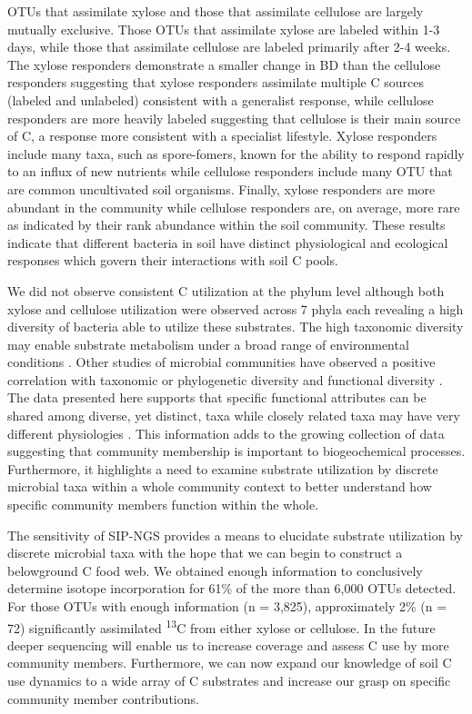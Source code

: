 OTUs that assimilate xylose and those that assimilate cellulose are largely mutually exclusive. Those OTUs that assimilate xylose are labeled within 1-3 days, while those that assimilate cellulose are labeled primarily after 2-4 weeks. The xylose responders demonstrate a smaller change in BD than the cellulose responders suggesting that xylose responders assimilate multiple C sources (labeled and unlabeled) consistent with a generalist response, while cellulose responders are more heavily labeled suggesting that cellulose is their main source of C, a response more consistent with a specialist lifestyle. Xylose responders include many taxa, such as spore-fomers, known for the ability to respond rapidly to an influx of new nutrients while cellulose responders include many OTU that are common uncultivated soil organisms. Finally, xylose responders are more abundant in the community while cellulose responders are, on average, more rare as indicated by their rank abundance within the soil community. These results indicate that different bacteria in soil have distinct physiological and ecological responses which govern their interactions with soil C pools. 

We did not observe consistent C utilization at the phylum level although both xylose and cellulose utilization were observed across 7 phyla each revealing a high diversity of bacteria able to utilize these substrates. The high taxonomic diversity may enable substrate metabolism under a broad range of environmental conditions \cite{Goldfarb_2011}. Other studies of microbial communities have observed a positive correlation with taxonomic or phylogenetic diversity and functional diversity \cite{Fierer_2012,Fierer_2013,Philippot_2010,Tringe_2005,Gilbert_2010,Bryant_2012}. The data presented here supports that specific functional attributes can be shared among diverse, yet distinct, taxa while closely related taxa may have very different physiologies \cite{Fierer_2012,Philippot_2010}. This information adds to the growing collection of data suggesting that community membership is important to biogeochemical processes. Furthermore, it highlights a need to examine substrate utilization by discrete microbial taxa within a whole community context to better understand how specific community members function within the whole. 

The sensitivity of SIP-NGS provides a means to elucidate substrate utilization by discrete microbial taxa with the hope that we can begin to construct a belowground C food web. We obtained enough information to conclusively determine isotope incorporation for 61\% of the more than 6,000 OTUs detected. For those OTUs with enough information (n = 3,825), approximately 2\% (n = 72) significantly assimilated \textsuperscript{13}C from either xylose or cellulose. In the future deeper sequencing will enable us to increase coverage and assess C use by more community members. Furthermore, we can now expand our knowledge of soil C use dynamics to a wide array of C substrates and increase our grasp on specific community member contributions.       
